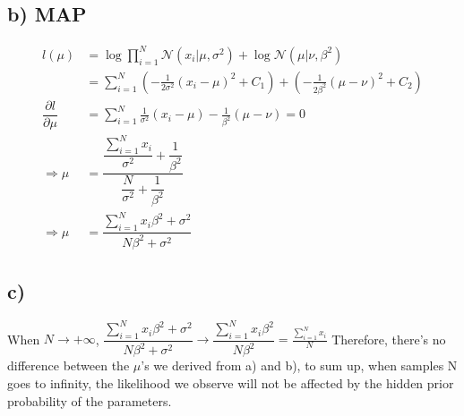 \documentclass[a4paper,12pt]{article}
\begin{document}
\subsection{b) MAP}
\begin{align}
l(\mu) & = \log\prod_{i = 1}^{N} \mathcal{N}(x_i \rvert \mu, \sigma^2) + \log \mathcal{N}(\mu \rvert \nu, \beta^2) \nonumber \\
& = \sum_{i = 1}^{N} ( -\frac{1}{2\sigma^2} (x_i - \mu)^2  +C_1 )+ (-\frac{1}{2\beta^2} (  \mu - \nu)^2 +C_2)  \nonumber \\
\dfrac{\partial l}{\partial \mu} &= \sum_{i = 1}^{N}  \frac{1}{\sigma^2} (x_i - \mu) - \frac{1}{\beta^2} (  \mu - \nu) = 0 \nonumber \\
\Rightarrow \mu &= \dfrac{\dfrac{\sum_{i = 1}^{N}x_i}{\sigma^2}+\dfrac{1}{\beta^2}}{\dfrac{N}{\sigma^2} + \dfrac{1}{\beta^2}}  \nonumber \\
\Rightarrow \mu & =  \dfrac{\sum_{i =1}^{N}x_i \beta^2 + \sigma^2}{N \beta^2 + \sigma^2} \nonumber 
\end{align}

\subsection{c)}
When $N \to +\infty$, $\dfrac{\sum_{i =1}^{N}x_i \beta^2 + \sigma^2}{N \beta^2 + \sigma^2} \to \dfrac{\sum_{i =1}^{N}x_i \beta^2 }{N \beta^2}  = \frac{\sum_{i = 1}^{N} x_i}{N}$
Therefore, there's no difference between the $\mu$'s we derived from a) and b), to sum up, when samples N goes to infinity, the likelihood we observe will not be affected by the hidden prior probability of the parameters.
\end{document}
